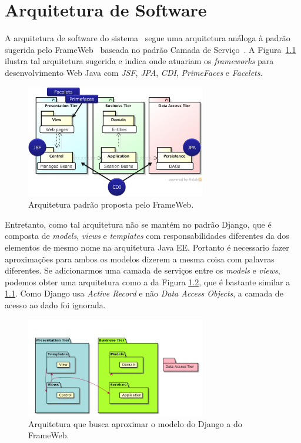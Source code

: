 
\chapter{Arquitetura de Software}
\label{sec-arquitetura}

A arquitetura de software do sistema~\imprimirtitulo{} segue uma arquitetura análoga à padrão sugerida pelo FrameWeb~\cite{souza:masterthesis07,souza-et-al:iism09} baseada no padrão Camada de Serviço~\cite{fowler:book02}. A Figura~\ref{figura-arquitetura-padrao} ilustra tal arquitetura sugerida e indica onde atuariam os \textit{frameworks} para desenvolvimento Web Java com \textit{JSF}, \textit{JPA}, \textit{CDI}, \textit{PrimeFaces} e \textit{Facelets}.

\begin{figure}[h]
	\centering
	\includegraphics[width=0.7\textwidth]{figuras/figura-arquitetura-padrao.png}
	\caption{Arquitetura padrão proposta pelo FrameWeb.}
	\label{figura-arquitetura-padrao}
\end{figure}

Entretanto, como tal arquitetura não se mantém no padrão Django, que é composta de \textit{models}, \textit{views} e \textit{templates} com responsabilidades diferentes da dos elementos de mesmo nome na arquitetura Java EE. Portanto é necessario fazer aproximações para ambos os modelos dizerem a mesma coisa com palavras diferentes. Se adicionarmos uma camada de serviços entre os \textit{models} e \textit{views}, podemos obter uma arquitetura como a da Figura \ref{figura-arquitetura-adaptada}, que é bastante similar a \ref{figura-arquitetura-padrao}. Como Django usa \textit{Active Record} e não \textit{Data Access Objects}, a camada de acesso ao dado foi ignorada.

\begin{figure}[h]
	\centering
	\includegraphics[width=0.7\textwidth, clip]{figuras/arquitetura.png}
	\caption{Arquitetura que busca aproximar o modelo do Django a do FrameWeb.}
	\label{figura-arquitetura-adaptada}
\end{figure}

